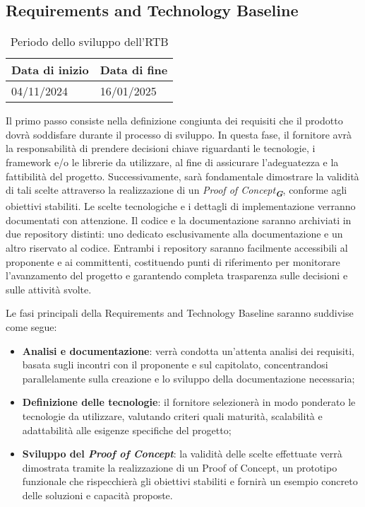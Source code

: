 \subsection{Requirements and Technology Baseline}
\begin{table}[h!]
    \centering
    \renewcommand{\arraystretch}{1.5} %
    \begin{tabularx}{\textwidth}{|X|X|}\hline
    \rowcolor[HTML]{FFD700} 
    \textbf{Data di inizio} & \textbf{Data di fine} \\ \hline
    04/11/2024 & 16/01/2025 \\ \hline
    \end{tabularx}
    \caption{Periodo dello sviluppo dell’RTB}
\end{table}
Il primo passo consiste nella definizione congiunta dei requisiti che il prodotto dovrà soddisfare durante il processo di sviluppo. In questa fase, il fornitore avrà la responsabilità di prendere decisioni chiave riguardanti le tecnologie, i framework e/o le librerie da utilizzare, al fine di assicurare l'adeguatezza e la fattibilità del progetto.
Successivamente, sarà fondamentale dimostrare la validità di tali scelte attraverso la realizzazione di un \emph{Proof of Concept}\textsubscript{\textit{\textbf{G}}}, conforme agli obiettivi stabiliti.
Le scelte tecnologiche e i dettagli di implementazione verranno documentati con attenzione.
Il codice e la documentazione saranno archiviati in due repository distinti: uno dedicato esclusivamente alla documentazione e un altro riservato al codice. Entrambi i repository saranno facilmente accessibili al proponente e ai committenti, costituendo punti di riferimento per monitorare l’avanzamento del progetto e garantendo completa trasparenza sulle decisioni e sulle attività svolte.

Le fasi principali della Requirements and Technology Baseline saranno suddivise come
segue:
\begin{itemize}
\item \textbf{Analisi e documentazione}: verrà condotta un’attenta analisi dei requisiti, basata sugli incontri con il proponente e sul capitolato, concentrandosi parallelamente sulla creazione e lo sviluppo della documentazione necessaria;
\item \textbf{Definizione delle tecnologie}: il fornitore selezionerà in modo ponderato le tecnologie da utilizzare, valutando criteri quali maturità, scalabilità e adattabilità alle esigenze specifiche del progetto;
\item \textbf{Sviluppo del {\emph{Proof of Concept}}}: la validità delle scelte effettuate verrà dimostrata tramite la realizzazione di un Proof of Concept, un prototipo funzionale che rispecchierà gli obiettivi stabiliti e fornirà un esempio concreto delle soluzioni e capacità proposte.
\end{itemize}


